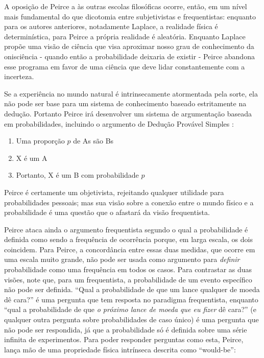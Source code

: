 A oposição de Peirce a às outras escolas filosóficas ocorre, então, em um nível mais fundamental do que dicotomia entre
subjetivistas e frequentistas: enquanto para os autores anteriores, notadamente Laplace, a realidade física 
é determinística, para Peirce a própria realidade é aleatória. Enquanto Laplace propõe uma visão de ciência que visa aproximar nosso
grau de conhecimento da onisciência - quando então a probabilidade deixaria de existir - Peirce abandona esse programa em favor
de uma ciência que deve lidar constantemente com a incerteza.

Se a experiência no mundo natural é intrinsecamente atormentada pela sorte, ela não pode ser base para um sistema de
conhecimento baseado estritamente na dedução. Portanto Peirce irá desenvolver
um sistema de argumentação baseada em probabilidades, incluindo o argumento de Dedução Provável 
Simples \citep{Fetzer93}:

\begin{enumerate}
	\item Uma proporção $p$ de As são Bs
	\item X é um A
	\item Portanto, X é um B com probabilidade $p$ 
\end{enumerate}

Peirce é certamente um objetivista, rejeitando qualquer utilidade para probabilidades pessoais; mas sua visão sobre a conexão entre o
mundo físico e a probabilidade é uma questão que o afastará da visão frequentista.
 
Peirce ataca ainda o argumento frequentista segundo o qual a probabilidade é definida como sendo a frequência
de ocorrência porque, em larga escala, os dois coincidem. Para Peirce, a concordância entre essas duas 
medidas, que ocorre em uma escala muito grande, não pode ser usada como argumento para {\em definir}
probabilidade como uma frequência em todos os casos. Para contrastar as duas visões, note que, para
um frequentista, a probabilidade de um evento específico não pode ser definida. ``Qual a probabilidade de que um lance qualquer
de moeda dê cara?'' é uma pergunta que tem resposta no paradigma frequentista, enquanto ``qual a probabilidade de que 
{\em o próximo lance de moeda que eu fizer} dê cara?'' (e qualquer outra pergunta sobre probabilidades de caso único)
é uma pergunta que não pode ser respondida, já que a probabilidade só é definida sobre uma série infinita
de experimentos. Para poder responder perguntas como esta, Peirce, lança
mão de uma propriedade física intrínseca descrita como ``would-be'':

